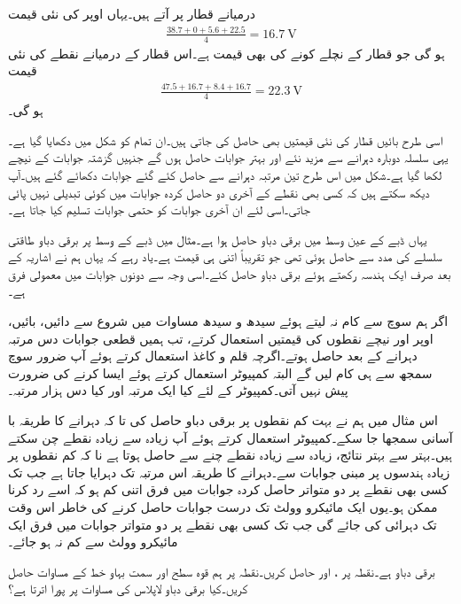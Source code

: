 درمیانے قطار پر آتے ہیں۔یہاں اوپر  کی نئی قیمت
\begin{align*}
\frac{38.7+0+5.6+22.5}{4}=\SI{16.7}{\volt}
\end{align*}
ہو گی جو قطار کے  نچلے کونے کی بھی قیمت ہے۔اس قطار کے درمیانے نقطے کی نئی قیمت
\begin{align*}
\frac{47.5+16.7+8.4+16.7}{4}=\SI{22.3}{\volt}
\end{align*}
ہو گی۔

اسی طرح بائیں قطار  کی نئی قیمتیں بھی حاصل کی جاتی ہیں۔ان تمام کو شکل  میں دکھایا گیا ہے۔یہی سلسلہ دوبارہ دہرانے سے مزید نئے اور بہتر جوابات حاصل ہوں گے جنہیں گزشتہ جوابات کے نیچے لکھا گیا ہے۔شکل میں اس طرح تین مرتبہ دہرانے سے حاصل کئے گئے جوابات دکھائے گئے ہیں۔آپ دیکھ سکتے ہیں کہ کسی بھی نقطے کے آخری دو حاصل کردہ جوابات میں کوئی تبدیلی نہیں پائی جاتی۔اسی لئے ان آخری جوابات کو حتمی جوابات تسلیم کیا جاتا ہے۔

یہاں ڈبے کے عین وسط میں برقی دباو  حاصل ہوا ہے۔مثال  میں ڈبے کے وسط پر برقی دباو طاقتی سلسلے کی مدد سے  حاصل ہوئی تھی جو تقریباً اتنی ہی قیمت ہے۔یاد رہے کہ یہاں ہم نے اشاریہ کے بعد صرف ایک ہندسہ رکھتے ہوئے برقی دباو حاصل کئے۔اسی وجہ سے دونوں جوابات میں معمولی فرق ہے۔ 

اگر ہم سوچ سے کام نہ لیتے ہوئے سیدھ و سیدھ مساوات  میں شروع سے دائیں، بائیں، اوپر اور نیچے نقطوں کی قیمتیں استعمال کرتے، تب ہمیں قطعی جوابات دس مرتبہ دہرانے کے بعد حاصل ہوتے۔اگرچہ قلم و کاغذ استعمال کرتے ہوئے آپ ضرور سوچ سمجھ سے ہی کام لیں گے البتہ کمپیوٹر استعمال کرتے ہوئے ایسا کرنے کی ضرورت پیش نہیں آتی۔کمپیوٹر کے لئے کیا ایک مرتبہ اور کیا دس ہزار مرتبہ۔

اس مثال میں ہم نے بہت کم نقطوں پر برقی دباو حاصل کی تا کہ دہرانے کا طریقہ با آسانی سمجھا جا سکے۔کمپیوٹر استعمال کرتے ہوئے آپ زیادہ سے زیادہ نقطے چن سکتے ہیں۔بہتر سے بہتر نتائج، زیادہ سے زیادہ نقطے چنے سے حاصل ہوتا ہے نا کہ کم نقطوں پر زیادہ ہندسوں پر مبنی جوابات سے۔دہرانے کا طریقہ اس مرتبہ تک دہرایا جاتا ہے جب تک کسی بھی نقطے پر دو متواتر حاصل کردہ جوابات میں فرق اتنی کم ہو کہ اسے رد کرنا ممکن ہو۔یوں ایک مائیکرو وولٹ تک درست جوابات حاصل کرنے کی خاطر اس وقت تک دہرائی کی جائے گی جب تک کسی بھی نقطے پر دو متواتر جوابات میں فرق ایک مائیکرو وولٹ سے کم نہ ہو جائے۔    

\newpage

برقی دباو  ہے۔نقطہ  پر ،  اور  حاصل کریں۔نقطہ  پر ہم قوہ سطح اور سمت بہاو خط کے مساوات حاصل کریں۔کیا برقی دباو لاپلاس کی مساوات پر پورا اترتا ہے؟

